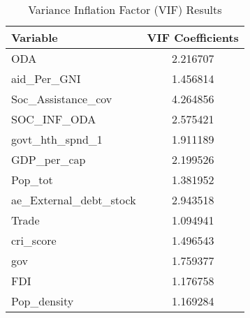   \begin{table}[H]
    \centering
      \caption{Variance Inflation Factor (VIF) Results}
    \begin{tabular}{|l|c|}
        \hline
        \textbf{Variable} & \textbf{VIF Coefficients} \\
        \hline
        ODA & 2.216707 \\
        aid\_Per\_GNI & 1.456814 \\
        Soc\_Assistance\_cov & 4.264856 \\
        SOC\_INF\_ODA & 2.575421 \\
        govt\_hth\_spnd\_1 & 1.911189 \\
        GDP\_per\_cap & 2.199526 \\
        Pop\_tot & 1.381952 \\
        ae\_External\_debt\_stock & 2.943518 \\
        Trade & 1.094941 \\
        cri\_score & 1.496543 \\
        gov & 1.759377 \\
        FDI & 1.176758 \\
        Pop\_density & 1.169284 \\
        \hline
    \end{tabular}
    \label{tab:VIF_reslts}
\end{table}
